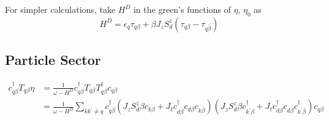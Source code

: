 \documentclass[14pt]{extarticle}
\numberwithin{equation}{section}
\begin{document}
For simpler calculations, take $H^D$ in the green's functions of $\eta$, $\eta_0$ as
\begin{equation}
 H^D = \epsilon_q\tau_{q\beta} + \beta J_zS^z_d \left( \tau_{q\beta} - \tau_{q\bar{\beta}} \right)  \label{eq:20} 
\end{equation}

\subsection{Particle Sector}
\begin{align}
 c^{\dag}_{q\beta}T_{q\beta}\eta &=  \frac{1}{\omega-H^D} c^{\dag}_{q\beta}T_{q\beta}  T_{q\beta}^{\dag}c_{q\beta}  \nonumber\\
&= \frac{1}{\omega - H^D} \sum\limits_{kk^{\prime}\ne q} c^{\dag}_{q\beta}\left( J_z S_d^z \beta c_{k\beta} + J_t c^{\dag}_{d\bar{\beta}} c_{d\beta} c_{k\bar{\beta}} \right) \left(  J_z S_d^z \beta c_{k^{\prime}\beta}^{\dag} + J_t c^{\dag}_{d\beta} c_{d\bar{\beta}} c^{\dag}_{k^{\prime}\bar{\beta}}  \right)  c_{q\beta}  \label{eq:24}
\end{align}
\end{document}
